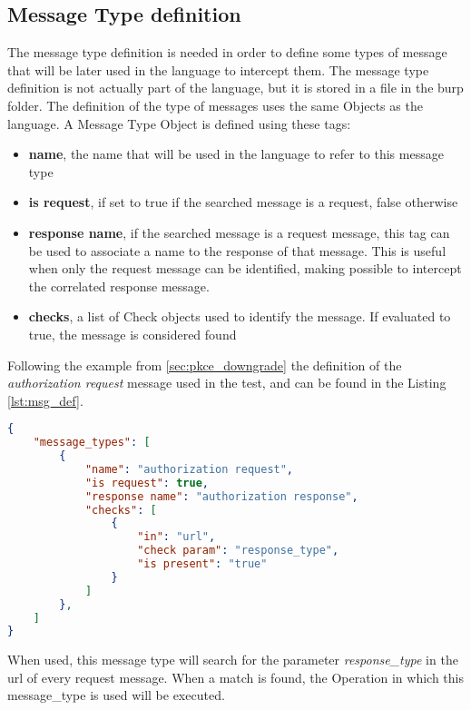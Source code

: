 \subsection{Message Type definition}
The message type definition is needed in order to define some types of message that will be later used in the language to intercept them.
The message type definition is not actually part of the language, but it is stored in a file in the \Gls{burp} folder. The definition of the type of messages uses the same Objects as the language.
A Message Type Object is defined using these tags:
\begin{itemize}
    \item \textbf{name}, the name that will be used in the language to refer to this message type
    \item \textbf{is request}, if set to true if the searched message is a request, false otherwise
    \item \textbf{response name}, if the searched message is a request message, this tag can be used to associate a name to the response of that message. This is useful when only the request message can be identified, making possible to intercept the correlated response message.
    \item \textbf{checks}, a list of Check objects used to identify the message. If evaluated to true, the message is considered found
\end{itemize}

Following the example from \ref{sec:pkce_downgrade} the definition of the \textit{authorization request} message used in the test, and can be found in the Listing \ref{lst:msg_def}.

\begin{lstlisting}[language=json, caption=Message Types definition, label={lst:msg_def}]
{
    "message_types": [
        {
            "name": "authorization request",
            "is request": true,
            "response name": "authorization response",
            "checks": [
                {
                    "in": "url",
                    "check param": "response_type",
                    "is present": "true"
                }
            ]
        },
    ]
}
\end{lstlisting}

When used, this message type will search for the parameter \textit{response\_type} in the url of every request message. When a match is found, the Operation in which this message\_type is used will be executed.


